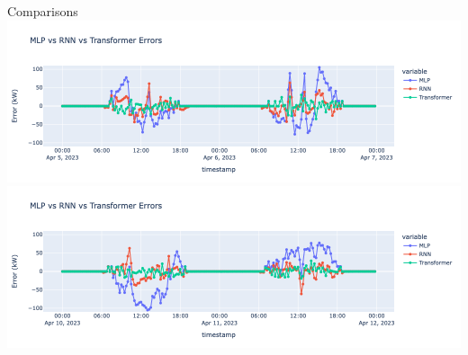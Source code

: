 \begin{frame}{Comparisons}
    \centering
    \includegraphics[width=\textwidth]{sections/5_eval/imgs/cmps/cmp3.png}
    \includegraphics[width=\textwidth]{sections/5_eval/imgs/cmps/cmp4.png}
\end{frame}

%    
%    
%         

